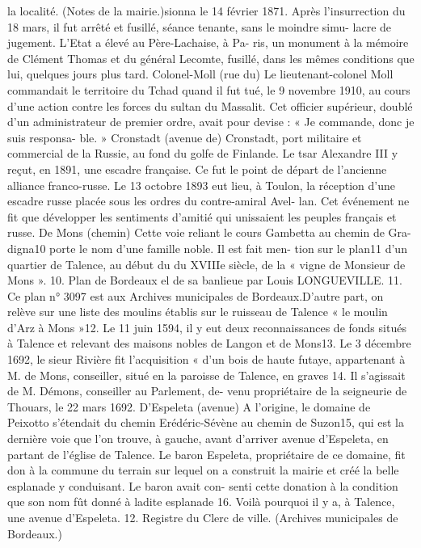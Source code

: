 \documentclass[a4paper,11pt]{book}
\begin{document}
la localité. (Notes de la mairie.)sionna le 14 février 1871. Après l'insurrection du 18 mars,
il fut arrêté et fusillé, séance tenante, sans le moindre simu-
lacre de jugement. L'Etat a élevé au Père-Lachaise, à Pa-
ris, un monument à la mémoire de Clément Thomas et du
général Lecomte, fusillé, dans les mêmes conditions que
lui, quelques jours plus tard.
Colonel-Moll (rue du)
Le lieutenant-colonel Moll commandait le territoire du
Tchad quand il fut tué, le 9 novembre 1910, au cours d'une
action contre les forces du sultan du Massalit. Cet officier
supérieur, doublé d'un administrateur de premier ordre,
avait pour devise : « Je commande, donc je suis responsa-
ble. »
Cronstadt (avenue de)
Cronstadt, port militaire et commercial de la Russie, au
fond du golfe de Finlande. Le tsar Alexandre III y reçut,
en 1891, une escadre française. Ce fut le point de départ
de l'ancienne alliance franco-russe.
Le 13 octobre 1893 eut lieu, à Toulon, la réception d'une
escadre russe placée sous les ordres du contre-amiral Avel-
lan. Cet événement ne fit que développer les sentiments
d'amitié qui unissaient les peuples français et russe.
De Mons (chemin)
Cette voie reliant le cours Gambetta au chemin de Gra-
digna10 porte le nom d'une famille noble. Il est fait men-
tion sur le plan11 d'un quartier de Talence, au début du
du XVIIIe siècle, de la « vigne de Monsieur de Mons ».
10. Plan de Bordeaux el de sa banlieue par Louis LONGUEVILLE.
11. Ce plan n° 3097 est aux Archives municipales de Bordeaux.D'autre part, on relève sur une liste des moulins établis
sur le ruisseau de Talence « le moulin d'Arz à Mons »12.
Le 11 juin 1594, il y eut deux reconnaissances de fonds
situés à Talence et relevant des maisons nobles de Langon
et de Mons13.
Le 3 décembre 1692, le sieur Rivière fit l'acquisition
« d'un bois de haute futaye, appartenant à M. de Mons,
conseiller, situé en la paroisse de Talence, en graves 14.
Il s'agissait de M. Démons, conseiller au Parlement, de-
venu propriétaire de la seigneurie de Thouars, le 22 mars
1692.
D'Espeleta (avenue)
A l'origine, le domaine de Peixotto s'étendait du chemin
Erédéric-Sévène au chemin de Suzon15, qui est la dernière
voie que l'on trouve, à gauche, avant d'arriver avenue
d'Espeleta, en partant de l'église de Talence.
Le baron Espeleta, propriétaire de ce domaine, fit don
à la commune du terrain sur lequel on a construit la mairie
et créé la belle esplanade y conduisant. Le baron avait con-
senti cette donation à la condition que son nom fût donné
à ladite esplanade 16. Voilà pourquoi il y a, à Talence, une
avenue d'Espeleta.
12. Registre du Clerc de ville. (Archives municipales de Bordeaux.)
\end{document}

